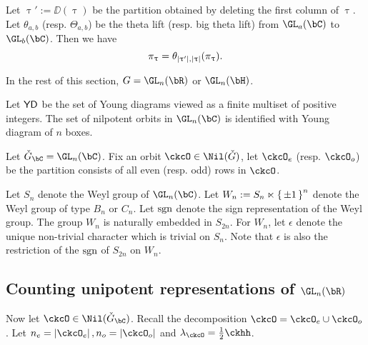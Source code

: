 \documentclass[counting_main.tex]{subfiles}
\begin{document}
Let $\uptau' := \DD(\uptau)$ be the partition obtained by deleting the first column
of $\uptau$.
Let $\theta_{a,b}$ (resp. $\Theta_{a,b}$) be the  theta lift (resp. big theta lift) from $\GL_a(\bC)$ to
$\GL_b(\bC)$.
Then we have
\[
  \pi_{\uptau} = \theta_{{\left|{\uptau'}\right|},{\left|{\uptau}\right|}} (\pi_{\uptau}).
\]

In the rest of this section, $G = \GL_{n}(\bR)$ or $\GL_{n}(\bH)$.

Let $\mathsf{YD}$ be the set of Young diagrams viewed as a finite multiset of positive
integers. The set of nilpotent orbits in $\GL_n(\bC)$ is identified with Young
diagram of $n$ boxes.


Let $\ckGc = \GL_n(\bC)$.
Fix
an orbit $\ckcO\in \Nil(\ckG)$, let $\ckcO_e$ (resp. $\ckcO_o$) be the partition
consists of all even (resp. odd) rows in $\ckcO$.

Let $S_n$ denote the Weyl group of $\GL_n(\bC)$.
Let $W_n := S_n \ltimes \set{\pm 1}^n$ denote the Weyl group of type $B_n$ or $C_n$.
Let $\operatorname{sgn}$ denote the sign representation of the Weyl group.
The group $W_n$ is naturally embedded in $S_{2n}$.
For $W_n$, let $\epsilon$ denote the unique non-trivial character which is trivial on $S_n$.
Note that $\epsilon$ is also the restriction of the $\operatorname{sgn}$ of $S_{2n}$ on $W_n$.



\subsection{Counting unipotent representations of $\GL_n(\bR)$}
Now let $\ckcO\in \Nil(\ckGc)$.
Recall the decomposition $\ckcO  = \ckcO_e \cup \ckcO_o$.
Let $n_e = \abs{\ckcO_e}, n_o = \abs{\ckcO_o}$ and $\lambda_\ckcO = \half \ckhh$.
\end{document}
